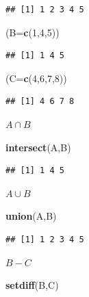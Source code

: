 \documentclass[]{book}
\newenvironment{Shaded}{\begin{snugshade}}{\end{snugshade}}
\newcommand{\DataTypeTok}[1]{\textcolor[rgb]{0.13,0.29,0.53}{#1}}
\newcommand{\DecValTok}[1]{\textcolor[rgb]{0.00,0.00,0.81}{#1}}
\newcommand{\KeywordTok}[1]{\textcolor[rgb]{0.13,0.29,0.53}{\textbf{#1}}}
\newcommand{\NormalTok}[1]{#1}
\begin{document}
\begin{verbatim}
## [1] 1 2 3 4 5
\end{verbatim}

\begin{Shaded}
\begin{Highlighting}[]
\NormalTok{(}\DataTypeTok{B=}\KeywordTok{c}\NormalTok{(}\DecValTok{1}\NormalTok{,}\DecValTok{4}\NormalTok{,}\DecValTok{5}\NormalTok{))}
\end{Highlighting}
\end{Shaded}

\begin{verbatim}
## [1] 1 4 5
\end{verbatim}

\begin{Shaded}
\begin{Highlighting}[]
\NormalTok{(}\DataTypeTok{C=}\KeywordTok{c}\NormalTok{(}\DecValTok{4}\NormalTok{,}\DecValTok{6}\NormalTok{,}\DecValTok{7}\NormalTok{,}\DecValTok{8}\NormalTok{))}
\end{Highlighting}
\end{Shaded}

\begin{verbatim}
## [1] 4 6 7 8
\end{verbatim}

\(A\cap B\)

\begin{Shaded}
\begin{Highlighting}[]
\KeywordTok{intersect}\NormalTok{(A,B)}
\end{Highlighting}
\end{Shaded}

\begin{verbatim}
## [1] 1 4 5
\end{verbatim}

\(A\cup B\)

\begin{Shaded}
\begin{Highlighting}[]
\KeywordTok{union}\NormalTok{(A,B)}
\end{Highlighting}
\end{Shaded}

\begin{verbatim}
## [1] 1 2 3 4 5
\end{verbatim}

\(B-C\)

\begin{Shaded}
\begin{Highlighting}[]
\KeywordTok{setdiff}\NormalTok{(B,C)}
\end{Highlighting}
\end{Shaded}
\end{document}
